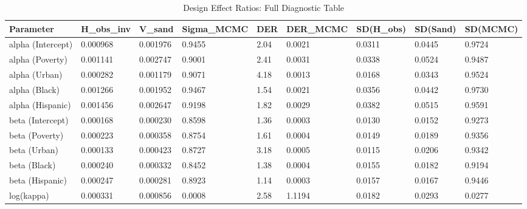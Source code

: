 \begin{table}[htbp]
\centering
\begin{tabular}{lllllllll}
  \toprule
Parameter & H_obs_inv & V_sand & Sigma_MCMC & DER & DER_MCMC & SD(H_obs) & SD(Sand) & SD(MCMC) \\ 
  \midrule
alpha (Intercept) & 0.000968 & 0.001976 & 0.9455 & 2.04 & 0.0021 & 0.0311 & 0.0445 & 0.9724 \\ 
  alpha (Poverty) & 0.001141 & 0.002747 & 0.9001 & 2.41 & 0.0031 & 0.0338 & 0.0524 & 0.9487 \\ 
  alpha (Urban) & 0.000282 & 0.001179 & 0.9071 & 4.18 & 0.0013 & 0.0168 & 0.0343 & 0.9524 \\ 
  alpha (Black) & 0.001266 & 0.001952 & 0.9467 & 1.54 & 0.0021 & 0.0356 & 0.0442 & 0.9730 \\ 
  alpha (Hispanic) & 0.001456 & 0.002647 & 0.9198 & 1.82 & 0.0029 & 0.0382 & 0.0515 & 0.9591 \\ 
  beta (Intercept) & 0.000168 & 0.000230 & 0.8598 & 1.36 & 0.0003 & 0.0130 & 0.0152 & 0.9273 \\ 
  beta (Poverty) & 0.000223 & 0.000358 & 0.8754 & 1.61 & 0.0004 & 0.0149 & 0.0189 & 0.9356 \\ 
  beta (Urban) & 0.000133 & 0.000423 & 0.8727 & 3.18 & 0.0005 & 0.0115 & 0.0206 & 0.9342 \\ 
  beta (Black) & 0.000240 & 0.000332 & 0.8452 & 1.38 & 0.0004 & 0.0155 & 0.0182 & 0.9194 \\ 
  beta (Hispanic) & 0.000247 & 0.000281 & 0.8923 & 1.14 & 0.0003 & 0.0157 & 0.0167 & 0.9446 \\ 
  log(kappa) & 0.000331 & 0.000856 & 0.0008 & 2.58 & 1.1194 & 0.0182 & 0.0293 & 0.0277 \\ 
   \bottomrule
\end{tabular}
\caption{Design Effect Ratios: Full Diagnostic Table} 
\end{table}
